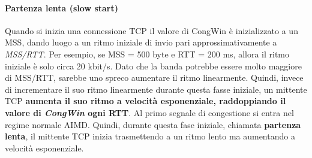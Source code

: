 \documentclass[11pt,a4paper]{book}
\begin{document}
\paragraph{Partenza lenta (slow start)}
Quando si inizia una connessione TCP il valore di CongWin è inizializzato a un MSS, dando luogo a un ritmo iniziale di invio pari approssimativamente a \emph{MSS/RTT}. Per esempio, se MSS = 500 byte e RTT = 200 ms, allora il ritmo iniziale è solo circa 20 kbit/s. Dato che la banda potrebbe essere molto maggiore di MSS/RTT, sarebbe uno spreco aumentare il ritmo linearmente. Quindi, invece di incrementare il suo ritmo linearmente durante questa fasse iniziale, un mittente TCP \textbf{aumenta il suo ritmo a velocità esponenziale, raddoppiando il valore di \emph{CongWin} ogni RTT}. Al primo segnale di congestione si entra nel regime normale AIMD. Quindi, durante questa fase iniziale, chiamata \textbf{partenza lenta}, il mittente TCP inizia trasmettendo a un ritmo lento ma aumentando a velocità esponenziale.
\end{document}
